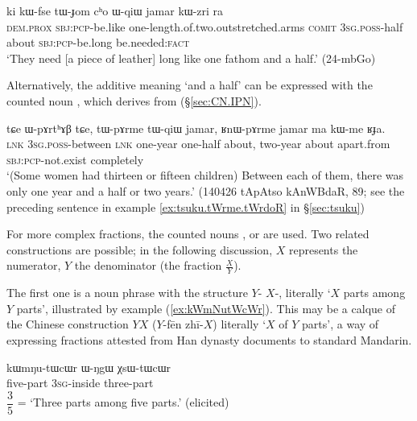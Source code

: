 \begin{exe}
\ex \label{ex:tWJom.cho.WqiW}
\gll ki kɯ-fse tɯ-ɟom cʰo ɯ-qiɯ jamar kɯ-zri ra \\
 \textsc{dem}.\textsc{prox} \textsc{sbj}:\textsc{pcp}-be.like one-length.of.two.outstretched.arms \textsc{comit} \textsc{3sg}.\textsc{poss}-half about \textsc{sbj}:\textsc{pcp}-be.long be.needed:\textsc{fact} \\
\glt `They need [a piece of leather] long like one fathom and a half.' (24-mbGo)
\end{exe}

Alternatively, the additive meaning `and a half' can be expressed with the counted noun , which derives from   (§\ref{sec:CN.IPN}). 

\begin{exe}
\ex \label{ex:tWqiW}
\gll tɕe ɯ-pɤrtʰɤβ tɕe, tɯ-pɤrme tɯ-qiɯ jamar, ʁnɯ-pɤrme jamar ma kɯ-me ʁɟa. \\
 \textsc{lnk} \textsc{3sg}.\textsc{poss}-between \textsc{lnk} one-year one-half about, two-year about apart.from \textsc{sbj}:\textsc{pcp}-not.exist completely  \\
\glt  `(Some women had thirteen or fifteen children) Between each of them, there was only one year and a half or two years.' (140426 tApAtso kAnWBdaR, 89; see the preceding sentence in example \ref{ex:tsuku.tWrme.tWrdoR} in §\ref{sec:tsuku})
\end{exe}

For more complex fractions, the counted nouns ,  or  are used. Two related constructions are possible; in the following discussion, $X$ represents the numerator, $Y$ the denominator (the fraction $\frac{X}{Y}$). 

The first one is a noun phrase with the structure $Y$-  $X$-, literally `$X$ parts among $Y$ parts', illustrated by example (\ref{ex:kWmNutWcWr}). This may be a calque of the Chinese construction $Y$$X$ 
($Y$-fēn zhī-$X$) literally `$X$ of $Y$ parts', a way of expressing fractions attested from Han dynasty documents \citep{anicotte15fractions} to standard Mandarin.
 
\begin{exe}
\ex \label{ex:kWmNutWcWr}
\gll kɯmŋu-tɯcɯr ɯ-ŋgɯ χsɯ-tɯcɯr  \\
 five-part \textsc{3sg}-inside three-part \\
\glt $\dfrac{3}{5}$ = `Three parts among five parts.' (elicited)
\end{exe}

